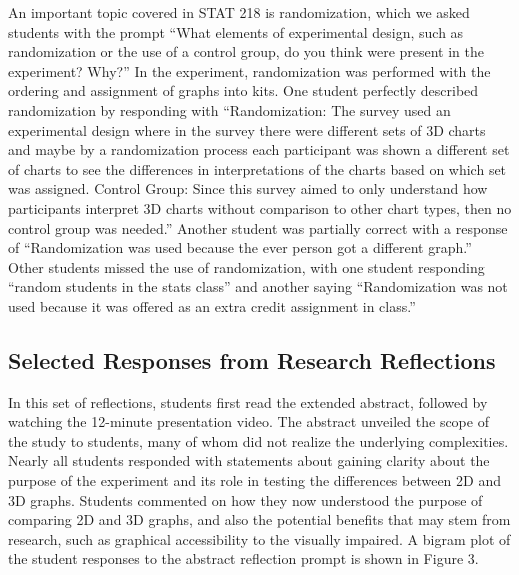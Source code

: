 \documentclass[
  12pt,
]{article}
\providecommand{\DIFdel}[1]{} %
\providecommand{\DIFadd}[1]{{\protect\color{blue} \sf #1}} %
\providecommand{\DIFdel}[1]{{\protect\color{red} [..\footnote{removed: #1} ]}} %
\providecommand{\DIFaddbegin}{} %
\providecommand{\DIFaddend}{} %
\providecommand{\DIFdelbegin}{} %
\providecommand{\DIFdelend}{} %
\newcommand{\DIFscaledelfig}{0.5}
\newlength{\DIFdelgraphicswidth} %
\newlength{\DIFdelgraphicsheight} %
\newcommand{\DIFaddincludegraphics}[2][]{{\color{blue}\fbox{\DIFOincludegraphics[#1]{#2}}}} %
\newcommand{\DIFdelincludegraphics}[2][]{%
\sbox{\DIFdelgraphicsbox}{\DIFOincludegraphics[#1]{#2}}%
\settoboxwidth{\DIFdelgraphicswidth}{\DIFdelgraphicsbox} %
\settoboxtotalheight{\DIFdelgraphicsheight}{\DIFdelgraphicsbox} %
\scalebox{\DIFscaledelfig}{%
\parbox[b]{\DIFdelgraphicswidth}{\usebox{\DIFdelgraphicsbox}\\[-\baselineskip] \rule{\DIFdelgraphicswidth}{0em}}\llap{\resizebox{\DIFdelgraphicswidth}{\DIFdelgraphicsheight}{%
\setlength{\unitlength}{\DIFdelgraphicswidth}%
\begin{picture}(1,1)%
\thicklines\linethickness{2pt} %
{\color[rgb]{1,0,0}\put(0,0){\framebox(1,1){}}}%
{\color[rgb]{1,0,0}\put(0,0){\line( 1,1){1}}}%
{\color[rgb]{1,0,0}\put(0,1){\line(1,-1){1}}}%
\end{picture}%
}\hspace*{3pt}}} %
} %
\DeclareRobustCommand{\DIFaddbegin}{\DIFOaddbegin \let\includegraphics\DIFaddincludegraphics} %
\DeclareRobustCommand{\DIFaddend}{\DIFOaddend \let\includegraphics\DIFOincludegraphics} %
\DeclareRobustCommand{\DIFdelbegin}{\DIFOdelbegin \let\includegraphics\DIFdelincludegraphics} %
\DeclareRobustCommand{\DIFdelend}{\DIFOaddend \let\includegraphics\DIFOincludegraphics} %
\begin{document}
An important topic covered in STAT 218 is randomization, which we asked
students with \DIFaddbegin \DIFadd{the prompt }\DIFaddend ``What elements of experimental design, such as
randomization or the use of a control group, do you think were present
in the experiment? Why?'' \DIFaddbegin \DIFadd{In the experiment, randomization was performed
with the ordering and assignment of graphs into kits. }\DIFaddend One student
perfectly described randomization by responding with ``Randomization:
The survey used an experimental design where in the survey there were
different sets of 3D charts and maybe by a randomization process each
participant was shown a different set of charts to see the differences
in interpretations of the charts based on which set was assigned.
Control Group: Since this survey aimed to only understand how
participants interpret 3D charts without comparison to other chart
types, then no control group was needed.'' Another student was partially
correct with a response of ``Randomization was used because the ever
person got a different graph.'' Other students missed the \DIFdelbegin \DIFdel{utilization }\DIFdelend \DIFaddbegin \DIFadd{use }\DIFaddend of
randomization, with one student responding ``random students in the
stats class'' and another saying ``Randomization was not used because it
was offered as an extra credit assignment in class.''

\subsection{Selected Responses from Research
Reflections}\label{selected-responses-from-research-reflections}

In this set of reflections, students first read the extended abstract,
followed by watching the 12-minute presentation video. The abstract
unveiled the scope of the study to students, many of whom did not
realize the underlying complexities. Nearly all students responded with
statements about gaining clarity about the purpose \DIFaddbegin \DIFadd{of }\DIFaddend the experiment and
its role in testing the differences between 2D and 3D graphs. \DIFdelbegin \DIFdel{A bigram
plot of the student responses to the abstract reflection prompt is shown
in Figure 3. }\DIFdelend Students
commented on how they now understood the purpose of comparing 2D and 3D
graphs, and also the potential benefits that may stem from research,
such as graphical accessibility to the visually impaired. \DIFaddbegin \DIFadd{A bigram plot
of the student responses to the abstract reflection prompt is shown in
Figure 3.
}\DIFaddend 
\end{document}
